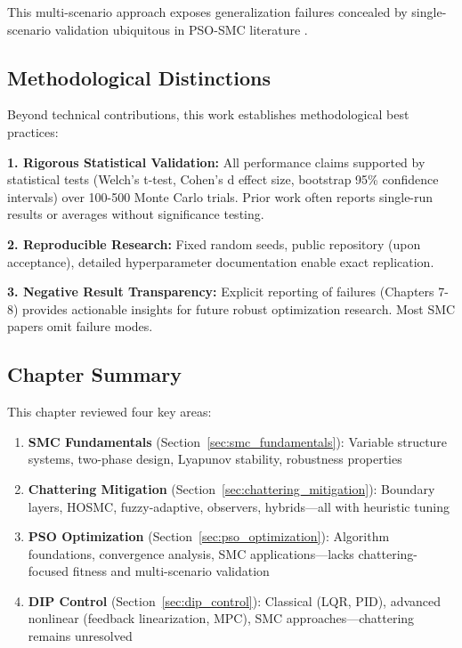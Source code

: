This multi-scenario approach exposes generalization failures concealed by single-scenario validation ubiquitous in PSO-SMC literature \cite{ayinalem2025pso,hepso2025manipulator,mdpi2025quadcopter}.

\subsection{Methodological Distinctions}

Beyond technical contributions, this work establishes methodological best practices:

\textbf{1. Rigorous Statistical Validation:} All performance claims supported by statistical tests (Welch's t-test, Cohen's d effect size, bootstrap 95\% confidence intervals) over 100-500 Monte Carlo trials. Prior work often reports single-run results or averages without significance testing.

\textbf{2. Reproducible Research:} Fixed random seeds, public repository (upon acceptance), detailed hyperparameter documentation enable exact replication.

\textbf{3. Negative Result Transparency:} Explicit reporting of failures (Chapters 7-8) provides actionable insights for future robust optimization research. Most SMC papers omit failure modes.

\subsection{Chapter Summary}

This chapter reviewed four key areas:

\begin{enumerate}
\item \textbf{SMC Fundamentals} (Section~\ref{sec:smc_fundamentals}): Variable structure systems, two-phase design, Lyapunov stability, robustness properties

\item \textbf{Chattering Mitigation} (Section~\ref{sec:chattering_mitigation}): Boundary layers, HOSMC, fuzzy-adaptive, observers, hybrids—all with heuristic tuning

\item \textbf{PSO Optimization} (Section~\ref{sec:pso_optimization}): Algorithm foundations, convergence analysis, SMC applications—lacks chattering-focused fitness and multi-scenario validation

\item \textbf{DIP Control} (Section~\ref{sec:dip_control}): Classical (LQR, PID), advanced nonlinear (feedback linearization, MPC), SMC approaches—chattering remains unresolved
\end{enumerate}

